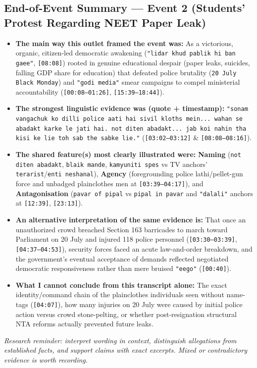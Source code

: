\documentclass[10pt,a4paper]{article}
\begin{document}
\subsection*{End-of-Event Summary --- Event 2 (Students' Protest Regarding NEET Paper Leak)}
\begin{itemize}[leftmargin=1.5em, itemsep=3pt, topsep=4pt]
  \item \textbf{The main way this outlet framed the event was:} As a victorious, organic, citizen-led democratic awakening (\texttt{"lidar khud pablik hi ban gaee"}, \texttt{[08:08]}) rooted in genuine educational despair (paper leaks, suicides, falling GDP share for education) that defeated police brutality (\texttt{20 July Black Monday}) and \texttt{"godi media"} smear campaigns to compel ministerial accountability (\texttt{[00:08--01:26]}, \texttt{[15:39--18:44]}).
  \item \textbf{The strongest linguistic evidence was (quote + timestamp):} \texttt{"sonam vangachuk ko dilli police aati hai sivil kloths mein... wahan se abadakt karke le jati hai. not diten abadakt... jab koi nahin tha kisi ke lie toh sab the sabke lie."} (\texttt{[03:02--03:12]} \& \texttt{[08:08--08:16]}).
  \item \textbf{The shared feature(s) most clearly illustrated were:} \textbf{Naming} (\texttt{not diten abadakt}, \texttt{blaik mande}, \texttt{kamyuniti spes} vs TV anchors' \texttt{terarist}/\texttt{enti neshanal}), \textbf{Agency} (foregrounding police lathi/pellet-gun force and unbadged plainclothes men at \texttt{[03:39--04:17]}), and \textbf{Antagonisation} (\texttt{pavar of pipal} vs \texttt{pipal in pavar} and \texttt{"dalali"} anchors at \texttt{[12:39]}, \texttt{[23:13]}).
  \item \textbf{An alternative interpretation of the same evidence is:} That once an unauthorized crowd breached Section 163 barricades to march toward Parliament on 20 July and injured 118 police personnel (\texttt{[03:30--03:39]}, \texttt{[04:37--04:53]}), security forces faced an acute law-and-order breakdown, and the government's eventual acceptance of demands reflected negotiated democratic responsiveness rather than mere bruised \texttt{"eego"} (\texttt{[00:40]}).
  \item \textbf{What I cannot conclude from this transcript alone:} The exact identity/command chain of the plainclothes individuals seen without name-tags (\texttt{[04:07]}), how many injuries on 20 July were caused by initial police action versus crowd stone-pelting, or whether post-resignation structural NTA reforms actually prevented future leaks.
\end{itemize}
\textit{Research reminder: interpret wording in context, distinguish allegations from established facts, and support claims with exact excerpts. Mixed or contradictory evidence is worth recording.}
\end{document}
